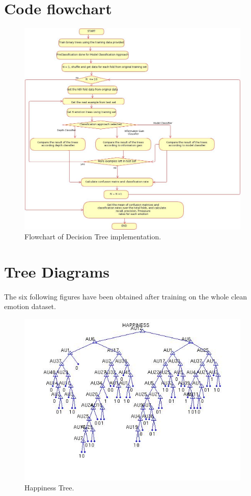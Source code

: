 \documentclass[a4paper,12pt,oneside,final]{report}
\newenvironment{changemargin}[2]{\begin{list}{}{%
\setlength{\topsep}{0pt}%
\setlength{\leftmargin}{0pt}%
\setlength{\rightmargin}{0pt}%
\setlength{\listparindent}{\parindent}%
\setlength{\itemindent}{\parindent}%
\setlength{\parsep}{0pt plus 1pt}%
\addtolength{\leftmargin}{#1}%
\addtolength{\rightmargin}{#2}%
}\item }{\end{list}}
\begin{document}
\section{Code flowchart}
\begin{figure}[p]
\begin{changemargin}{-50mm}{-50mm}
\center
\includegraphics[width=0.6\linewidth,height=0.97\textheight]{Main_flowchart.jpg}
\caption{Flowchart of Decision Tree implementation.}
\end{changemargin}
\end{figure}


\section{Tree Diagrams}
\paragraph{}
The six following figures have been obtained after training on the whole clean emotion dataset.
\label{ch:trees}
\begin{figure}[!h]
\begin{changemargin}{-20mm}{-20mm}
\center
\includegraphics[scale=1]{happiness.jpg}
\caption{Happiness Tree.}
\end{changemargin}
\end{figure}
\end{document}
